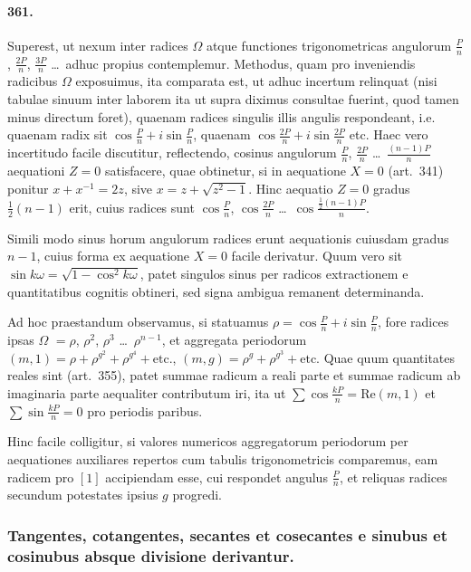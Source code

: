 \documentclass[12pt,a4paper]{article}
\theoremstyle{plain}
\theoremstyle{definition}
\theoremstyle{remark}
\begin{document}
\paragraph{361.}
Superest, ut nexum inter radices $\Omega$ atque functiones trigonometricas
angulorum $\frac{P}{n}$, $\frac{2P}{n}$, $\frac{3P}{n}$ \ldots\ adhuc propius
contemplemur. Methodus, quam pro inveniendis radicibus $\Omega$ exposuimus,
ita comparata est, ut adhuc incertum relinquat (nisi tabulae sinuum inter
laborem ita ut supra diximus consultae fuerint, quod tamen minus directum
foret), quaenam radices singulis illis angulis respondeant, i.e. quaenam radix
sit $\cos\frac{P}{n} + i\sin\frac{P}{n}$, quaenam
$\cos\frac{2P}{n} + i\sin\frac{2P}{n}$ etc. Haec vero incertitudo facile
discutitur, reflectendo, cosinus angulorum $\frac{P}{n}$,
$\frac{2P}{n}$ \ldots\ $\frac{(n-1)P}{n}$ aequationi $Z = 0$ satisfacere,
quae obtinetur, si in aequatione $X = 0$ (art.~341) ponitur $x + x^{-1} = 2z$,
sive $x = z + \sqrt{z^2 - 1}$. Hinc aequatio $Z = 0$ gradus
$\frac{1}{2}(n-1)$ erit, cuius radices sunt $\cos\frac{P}{n}$,
$\cos\frac{2P}{n}$ \ldots\ $\cos\frac{\frac{1}{2}(n-1)P}{n}$.

Simili modo sinus horum angulorum radices erunt aequationis cuiusdam
gradus $n-1$, cuius forma ex aequatione $X = 0$ facile derivatur.
Quum vero sit $\sin k\omega = \sqrt{1 - \cos^2 k\omega}$, patet singulos sinus
per radicos extractionem e quantitatibus cognitis obtineri, sed signa
ambigua remanent determinanda.

Ad hoc praestandum observamus, si statuamus
$\rho = \cos\frac{P}{n} + i\sin\frac{P}{n}$, fore radices ipsas $\Omega$
$= \rho$, $\rho^2$, $\rho^3$ \ldots\ $\rho^{n-1}$, et aggregata periodorum
$(m,1) = \rho + \rho^{g^2} + \rho^{g^4} + \text{etc.}$, $(m,g) = \rho^g + \rho^{g^3} + \text{etc.}$
Quae quum quantitates reales sint (art.~355), patet summae radicum
a reali parte et summae radicum ab imaginaria parte aequaliter contributum
iri, ita ut $\sum\cos\frac{kP}{n} = \text{Re}(m,1)$ et
$\sum\sin\frac{kP}{n} = 0$ pro periodis paribus.

Hinc facile colligitur, si valores numericos aggregatorum periodorum
per aequationes auxiliares repertos cum tabulis trigonometricis comparemus,
eam radicem pro $[1]$ accipiendam esse, cui respondet angulus
$\frac{P}{n}$, et reliquas radices secundum potestates ipsius $g$ progredi.

\subsubsection*{Tangentes, cotangentes, secantes et cosecantes e sinubus et cosinubus absque divisione derivantur.}
\end{document}
